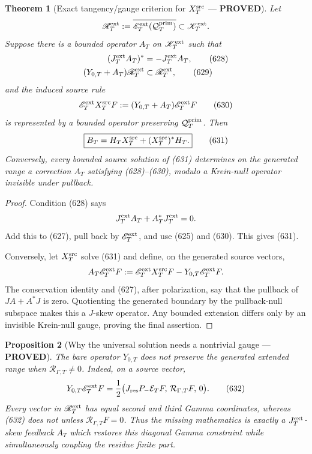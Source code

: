 \documentclass[11pt]{article}
\newtheorem{theorem}{Theorem}
\newtheorem{proposition}[theorem]{Proposition}
\newcommand{\PROVED}{\textcolor{green!45!black}{\textbf{PROVED}}}
\begin{document}
\begin{theorem}[Exact tangency/gauge criterion for
\(X_T^{\rm src}\) --- \PROVED]
Let
\[
 \mathscr R_T^{\rm ext}:=
 \overline{\mathscr E_T^{\rm ext}
  (\mathcal Q_T^{\rm prim})}
 \subset\mathscr K_T^{\rm ext}.
\]
Suppose there is a bounded operator \(A_T\) on
\(\mathscr K_T^{\rm ext}\) such that
\begin{align}
 (J_T^{\rm ext}A_T)^*&=-J_T^{\rm ext}A_T,            \tag{628}\\
 (Y_{0,T}+A_T)\mathscr R_T^{\rm ext}
 &\subset\mathscr R_T^{\rm ext},                     \tag{629}
\end{align}
and the induced source rule
\begin{equation}
 \mathscr E_T^{\rm ext}X_T^{\rm src}F
 :=(Y_{0,T}+A_T)\mathscr E_T^{\rm ext}F              \tag{630}
\end{equation}
is represented by a bounded operator preserving
\(\mathcal Q_T^{\rm prim}\).  Then
\begin{equation}
 \boxed{B_T=H_TX_T^{\rm src}
 +(X_T^{\rm src})^*H_T.}                             \tag{631}
\end{equation}
Conversely, every bounded source solution of (631) determines on the
generated range a correction \(A_T\) satisfying (628)--(630), modulo a
Krein-null operator invisible under pullback.
\end{theorem}

\begin{proof}
Condition (628) says
\[
 J_T^{\rm ext}A_T+A_T^*J_T^{\rm ext}=0.
\]
Add this to (627), pull back by \(\mathscr E_T^{\rm ext}\), and use
(625) and (630).  This gives (631).

Conversely, let \(X_T^{\rm src}\) solve (631) and define, on the generated
source vectors,
\[
 A_T\mathscr E_T^{\rm ext}F
 :=\mathscr E_T^{\rm ext}X_T^{\rm src}F
   -Y_{0,T}\mathscr E_T^{\rm ext}F.
\]
The conservation identity and (627), after polarization, say that the
pullback of \(J A+A^*J\) is zero.  Quotienting the generated boundary by
the pullback-null subspace makes this a \(J\)-skew operator.  Any bounded
extension differs only by an invisible Krein-null gauge, proving the final
assertion.
\end{proof}

\begin{proposition}[Why the universal solution needs a nontrivial gauge ---
\PROVED]
The bare operator \(Y_{0,T}\) does not preserve the generated extended
range when \(\mathcal R_{\Gamma,T}\ne0\).  Indeed, on a source vector,
\begin{equation}
 Y_{0,T}\mathscr E_T^{\rm ext}F
 =\frac12\bigl(J_{\rm res}P_-\mathcal E_TF,\,
               \mathcal R_{\Gamma,T}F,\,0\bigr).     \tag{632}
\end{equation}
Every vector in \(\mathscr R_T^{\rm ext}\) has equal second and third Gamma
coordinates, whereas (632) does not unless
\(\mathcal R_{\Gamma,T}F=0\).  Thus the missing mathematics is exactly a
\(J_T^{\rm ext}\)-skew feedback \(A_T\) which restores this diagonal Gamma
constraint while simultaneously coupling the residue finite part.
\end{proposition}
\end{document}

